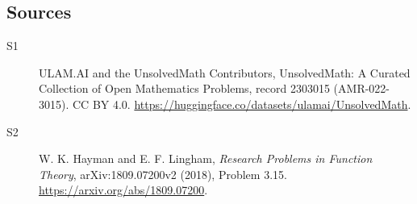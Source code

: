 \documentclass[11pt]{article}
\begin{document}
\subsection{Sources}
\begin{description}
\item[\hypertarget{source:2303015:1}{S1}] ULAM.AI and the UnsolvedMath Contributors, UnsolvedMath: A Curated Collection of Open Mathematics Problems, record 2303015 (AMR-022-3015). CC BY 4.0. \url{https://huggingface.co/datasets/ulamai/UnsolvedMath}.
\item[\hypertarget{source:2303015:2}{S2}] W. K. Hayman and E. F. Lingham, \emph{Research Problems in Function Theory}, arXiv:1809.07200v2 (2018), Problem 3.15. \url{https://arxiv.org/abs/1809.07200}.
\end{description}
\label{end:2303015}
\end{document}
